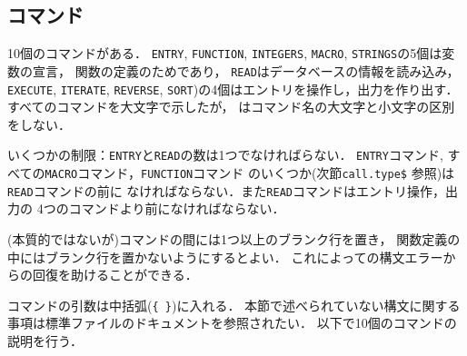 \subsection{コマンド}

10個のコマンドがある．
\hbox{\tt ENTRY}, \hbox{\tt FUNCTION}, \hbox{\tt INTEGERS},
\hbox{\tt MACRO}, \hbox{\tt STRINGS}の5個は変数の宣言，
関数の定義のためであり，
\hbox{\tt READ}はデータベースの情報を読み込み，
\hbox{\tt EXECUTE}, \hbox{\tt ITERATE}, \hbox{\tt REVERSE},
\hbox{\tt SORT})の4個はエントリを操作し，出力を作り出す．
すべてのコマンドを大文字で示したが，
\BibTeX はコマンド名の大文字と小文字の区別をしない．

いくつかの制限：{\tt ENTRY}と{\tt READ}の数は1つでなければらない．
{\tt ENTRY}コマンド, すべての{\tt MACRO}コマンド，{\tt FUNCTION}コマンド
のいくつか(次節{\tt call.type\$} 参照)は{\tt READ}コマンドの前に
なければならない．また{\tt READ}コマンドはエントリ操作，出力の
4つのコマンドより前になければならない．

(本質的ではないが)コマンドの間には1つ以上のブランク行を置き，
関数定義の中にはブランク行を置かないようにするとよい．
これによって\BibTeX の構文エラーからの回復を助けることができる．

コマンドの引数は中括弧(\verb|{ }|)に入れる．
本節で述べられていない構文に関する事項は標準ファイルのドキュメントを参照されたい．
以下で10個のコマンドの説明を行う．

